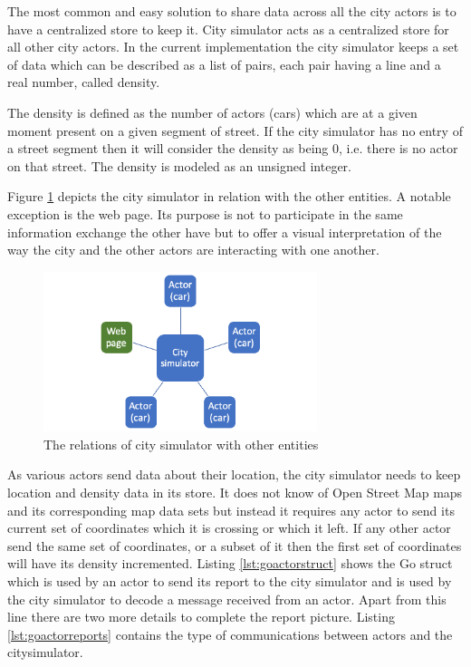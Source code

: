 \documentclass[conference]{IEEEtran}
\begin{document}
The most common and easy solution to share data across all the city actors is to have a centralized store to keep it. City simulator acts as a centralized store for all other city actors. In the current implementation the city simulator keeps a set of data which can be described as a list of pairs, each pair having a line and a real number, called density.

The density is defined as the number of actors (cars) which are at a given moment present on a given segment of street. If the city simulator has no entry of a street segment then it will consider the density as being 0, i.e. there is no actor on that street. The density is modeled as an unsigned integer.

Figure \ref{fig:citysimrelations} depicts the city simulator in relation with the other entities. A notable exception is the web page. Its purpose is not to participate in the same information exchange the other have but to offer a visual interpretation of the way the city and the other actors are interacting with one another.

\begin{figure}
    \includegraphics[width=8cm]{CitySimulator.png}
    \centering
    \caption{The relations of city simulator with other entities}
    \label{fig:citysimrelations}
\end{figure}

As various actors send data about their location, the city simulator needs to keep location and density data in its store. It does not know of Open Street Map maps and its corresponding map data sets but instead it requires any actor to send its current set of coordinates which it is crossing or which it left. If any other actor send the same set of coordinates, or a subset of it then the first set of coordinates will have its density incremented. Listing \ref{lst:goactorstruct} shows the Go struct which is used by an actor to send its report to the city simulator and is used by the city simulator to decode a message received from an actor. Apart from this line there are two more details to complete the report picture. Listing \ref{lst:goactorreports} contains the type of communications between actors and the citysimulator.
\end{document}
